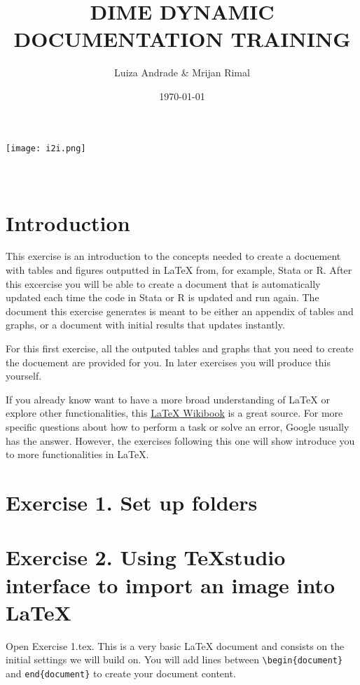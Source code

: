 \documentclass[12pts]{report}
\title{DIME DYNAMIC DOCUMENTATION TRAINING }
\author{Luiza Andrade \& Mrijan Rimal}
\date{\today}
\begin{document}
	

\makeatletter
\begin{titlepage}
	\begin{center}
		\texttt{[image: i2i.png]}\\[10ex]
		{\LARGE \bfseries  \@title }\\[2ex] 
		{\Large  \@author}\\[20ex] 
		{\large \@date}
	\end{center}
\end{titlepage}
\makeatother

\section*{Introduction}
This exercise is an introduction to the concepts needed to create a docuement with tables and figures outputted in {\LaTeX} from, for example, Stata or R. After this excercise you will be able to create a document that is automatically updated each time the code in Stata or R is updated and run again. The document this exercise generates is meant to be either an appendix of tables and graphs, or a document with initial results that updates instantly.

For this first exercise, all the outputed tables and graphs that you need to create the docuement are provided for you. In later exercises you will produce this yourself.

If you already know want to have a more broad understanding of {\LaTeX} or explore other functionalities, this \href{https://en.wikibooks.org/wiki/LaTeX
}{{\LaTeX} Wikibook} is a great source. For more specific questions about how to perform a task or solve an error, Google usually has the answer. However, the exercises following this one will show introduce you to more functionalities in {\LaTeX}.

\section*{Exercise 1. Set up folders}


\section*{Exercise 2. Using TeXstudio interface to import an image into \LaTeX}
Open Exercise 1.tex. This is a very basic {\LaTeX} document and consists on the initial settings we will build on. You will add lines between \verb|\begin{document}| and \verb|end{document}| to create your document content.
\end{document}
